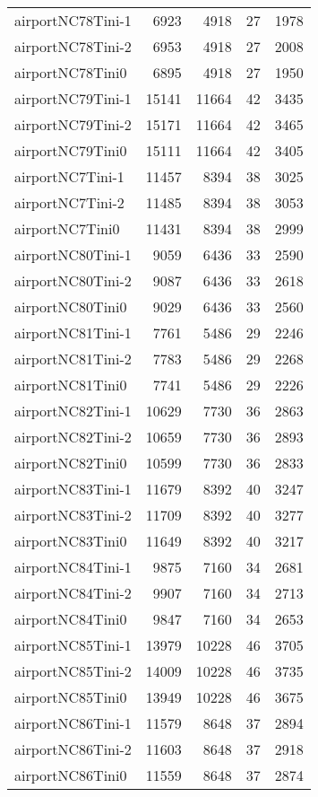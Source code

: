 \begin{tabular}{lrrrr}
airportNC78Tini-1 & 6923 & 4918 & 27 & 1978 \\
airportNC78Tini-2 & 6953 & 4918 & 27 & 2008 \\
airportNC78Tini0 & 6895 & 4918 & 27 & 1950 \\
airportNC79Tini-1 & 15141 & 11664 & 42 & 3435 \\
airportNC79Tini-2 & 15171 & 11664 & 42 & 3465 \\
airportNC79Tini0 & 15111 & 11664 & 42 & 3405 \\
airportNC7Tini-1 & 11457 & 8394 & 38 & 3025 \\
airportNC7Tini-2 & 11485 & 8394 & 38 & 3053 \\
airportNC7Tini0 & 11431 & 8394 & 38 & 2999 \\
airportNC80Tini-1 & 9059 & 6436 & 33 & 2590 \\
airportNC80Tini-2 & 9087 & 6436 & 33 & 2618 \\
airportNC80Tini0 & 9029 & 6436 & 33 & 2560 \\
airportNC81Tini-1 & 7761 & 5486 & 29 & 2246 \\
airportNC81Tini-2 & 7783 & 5486 & 29 & 2268 \\
airportNC81Tini0 & 7741 & 5486 & 29 & 2226 \\
airportNC82Tini-1 & 10629 & 7730 & 36 & 2863 \\
airportNC82Tini-2 & 10659 & 7730 & 36 & 2893 \\
airportNC82Tini0 & 10599 & 7730 & 36 & 2833 \\
airportNC83Tini-1 & 11679 & 8392 & 40 & 3247 \\
airportNC83Tini-2 & 11709 & 8392 & 40 & 3277 \\
airportNC83Tini0 & 11649 & 8392 & 40 & 3217 \\
airportNC84Tini-1 & 9875 & 7160 & 34 & 2681 \\
airportNC84Tini-2 & 9907 & 7160 & 34 & 2713 \\
airportNC84Tini0 & 9847 & 7160 & 34 & 2653 \\
airportNC85Tini-1 & 13979 & 10228 & 46 & 3705 \\
airportNC85Tini-2 & 14009 & 10228 & 46 & 3735 \\
airportNC85Tini0 & 13949 & 10228 & 46 & 3675 \\
airportNC86Tini-1 & 11579 & 8648 & 37 & 2894 \\
airportNC86Tini-2 & 11603 & 8648 & 37 & 2918 \\
airportNC86Tini0 & 11559 & 8648 & 37 & 2874 \\

\end{tabular}
